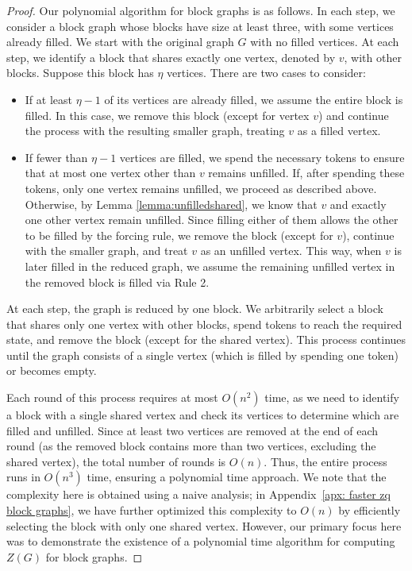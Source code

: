\documentclass[11pt]{article}
\theoremstyle{plain}
\theoremstyle{definition}
\theoremstyle{remark}
\begin{document}
\begin{proof}
    
Our polynomial algorithm for block graphs is as follows. In each step, we consider a block graph whose blocks have size at least three, with some vertices already filled. We start with the original graph $G$ with no filled vertices. At each step, we identify a block that shares exactly one vertex, denoted by $v$, with other blocks. Suppose this block has $\eta$ vertices. There are two cases to consider:

\begin{itemize}
    \item If at least $\eta - 1$ of its vertices are already filled, we assume the entire block is filled. In this case, we remove this block (except for vertex $v$) and continue the process with the resulting smaller graph, treating $v$ as a filled vertex.  

    \item If fewer than $\eta - 1$ vertices are filled, we spend the necessary tokens to ensure that at most one vertex other than $v$ remains unfilled. If, after spending these tokens, only one vertex remains unfilled, we proceed as described above. Otherwise, by Lemma \ref{lemma:unfilledshared}, we know that $v$ and exactly one other vertex remain unfilled. Since filling either of them allows the other to be filled by the forcing rule, we remove the block (except for $v$), continue with the smaller graph, and treat $v$ as an unfilled vertex. This way, when $v$ is later filled in the reduced graph, we assume the remaining unfilled vertex in the removed block is filled via Rule 2.      
\end{itemize}

At each step, the graph is reduced by one block. We arbitrarily select a block that shares only one vertex with other blocks, spend tokens to reach the required state, and remove the block (except for the shared vertex). This process continues until the graph consists of a single vertex (which is filled by spending one token) or becomes empty.  


Each round of this process requires at most $O(n^2)$ time, as we need to identify a block with a single shared vertex and check its vertices to determine which are filled and unfilled. Since at least two vertices are removed at the end of each round (as the removed block contains more than two vertices, excluding the shared vertex), the total number of rounds is $O(n)$. Thus, the entire process runs in $O(n^3)$ time, ensuring a polynomial time approach. We note that the complexity here is obtained using a naive analysis; in Appendix~\ref{apx: faster zq block graphs}, we have further optimized this complexity to $O(n)$ by efficiently selecting the block with only one shared vertex. However, our primary focus here was to demonstrate the existence of a polynomial time algorithm for computing $Z(G)$ for block graphs.
\end{proof}
\end{document}
